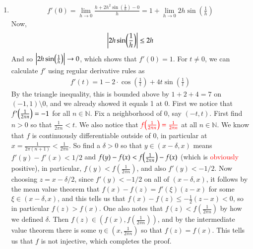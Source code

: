 \documentclass[12pt]{article}
\theoremstyle{definitionstyle}
\def\mbb#1{\mathbb{#1}}
\def\bN{\mbb{N}}
\begin{document}
\begin{enumerate}[leftmargin=\labelsep]
		\item 
		\begin{align*}
			f'(0) = \lim_{h \to 0} \frac{h + 2h^2\sin(\frac1h) - 0}{h} = 1 + \lim_{h \to 0} 2h\sin(\frac1h)
		\end{align*}
		Now,
		\begin{align*}
			\qty|2h\sin(\frac1h)| \leq 2h
		\end{align*}
		And so $\qty|2h\sin(\frac1h)| \to 0$, which shows that $f'(0) = 1$. For $t \neq 0$, we can calculate $f'$ using regular derivative rules as
		\begin{align*}
			f'(t) = 1 - 2\cdot \cos(\frac1t) + 4t \sin(\frac1t) 
		\end{align*}
		By the triangle inequality, this is bounded above by $1 + 2 + 4 = 7$ on $(-1, 1) \setminus 0$, and we already showed it equals 1 at 0. First we notice that $f'\qty(\frac{1}{2\pi n}) = -1$ for all $n \in \bN$. Fix a neighborhood of 0, say $(-t, t)$. First find $n > 0$ so that $\frac{1}{2\pi n} < t$. We also notice that $\color{red}{f\qty(\frac{1}{2\pi n}) = \frac{1}{2\pi n}}$ at all $n \in \bN$. We know that $f$ is continuously differentiable outside of 0, in particular at $x = \frac{1}{2\pi (n+1)} < \frac{1}{2\pi n}$. So find a $\delta > 0$ so that $y \in (x-\delta, x)$ means $f'(y) - f'(x) < 1/2$ and $f(y) - f(x) < f\qty(\frac{1}{2\pi n}) - f(x)$ (which is \textcolor{red}{obviously} positive), in particular, $f(y) < f(\frac{1}{2\pi n})$, and also $f'(y) < -1/2$. Now choosing $z = x - \delta/2$, since $f'(y) < -1/2$ on all of $(x-\delta, x)$, it follows by the mean value theorem that $f(x) - f(z) = f'(\xi)(z-x)$ for some $\xi \in (x-\delta, x)$, and this tells us that $f(x) - f(z) \leq -\frac12(z-x) < 0$, so in particular $f(z) > f(x)$. One also notes that $f(z) < f(\frac{1}{2\pi n})$ by how we defined $\delta$. Then $f(z) \in (f(x), f(\frac{1}{2\pi n}))$, and by the intermediate value theorem there is some $\eta \in (x, \frac{1}{2\pi n})$ so that $f(z) = f(x)$. This tells us that $f$ is not injective, which completes the proof.
	\end{enumerate}
\end{document}
